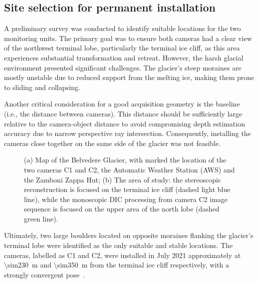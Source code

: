 \subsection{Site selection for permanent installation}\label{sec:4:siteselection}

A preliminary survey was conducted to identify suitable locations for the two monitoring units. 
The primary goal was to ensure both cameras had a clear view of the northwest terminal lobe, particularly the terminal ice cliff,
as this area experiences substantial transformation and retreat. 
However, the harsh glacial environment presented significant challenges. 
The glacier's steep moraines are mostly unstable due to reduced support from the melting ice, making them prone to sliding and collapsing.

Another critical consideration for a good acquisition geometry is the baseline (i.e., the distance between cameras). 
This distance should be sufficiently large relative to the camera-object distance to avoid compromising depth estimation accuracy due to narrow perspective ray intersection. 
Consequently, installing the cameras close together on the same side of the glacier was not feasible.

\begin{figure}
  \centering
  \caption{(a) Map of the Belvedere Glacier, with marked the location of the two cameras C1 and C2, the Automatic Weather Station (AWS) and the Zamboni Zappa Hut;
  (b) The area of study: the stereoscopic reconstruction is focused on the terminal ice cliff (dashed light blue line), while the monoscopic DIC processing from camera C2 image sequence is focused on the upper area of the north lobe (dashed green line).}
  \label{fig:4:studyarea}
\end{figure}

Ultimately, two large boulders located on opposite moraines flanking the glacier's terminal lobe were identified as the only suitable and stable locations.
The cameras, labelled as C1 and C2, were installed in July 2021 approximately at \SI{\sim230}{\meter} and \SI{\sim350}{\meter} from the terminal ice cliff respectively, with a strongly convergent pose~.

